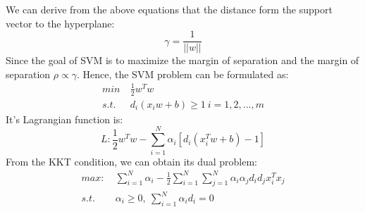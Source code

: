 \documentclass[twocolumn, a4paper]{article}
\begin{document}
We can derive from the above equations that the distance form the support vector to the hyperplane:
\begin{equation}
\nonumber
  \gamma = \frac{1}{||w||}
\end{equation}
Since the goal of SVM is to maximize the margin of separation and the margin of separation $\rho \propto \gamma$. Hence, the SVM problem can be formulated as:
\begin{equation}
\begin{aligned}
\nonumber
  min\ &\frac{1}{2}w^Tw\\
  s.t.\ &d_i(x_iw+b)\ge 1\ i=1,2,...,m
\end{aligned}
\end{equation}
It's Lagrangian function is:
\begin{equation}
\nonumber
  L: \frac{1}{2}w^Tw-\sum_{i=1}^N\alpha_i[d_i(x_i^Tw+b)-1]
\end{equation}
From the KKT condition, we can obtain its dual problem:
\begin{equation}
\begin{aligned}
\nonumber
  max:\ &\sum_{i=1}^N\alpha_i-\frac{1}{2}\sum_{i=1}^N\sum_{j=1}^N\alpha_i\alpha_jd_id_jx_i^Tx_j\\
  s.t.\ \ &\alpha_i\ge 0,\ \sum_{i=1}^N\alpha_id_i=0
\end{aligned}
\end{equation}
\end{document}
